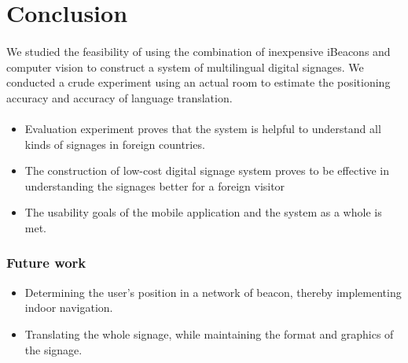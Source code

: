 \documentclass[12pt]{article}
\begin{document}
\section{Conclusion}
\label{sect-conclusion}
\paragraph{}We studied the feasibility of using the combination of inexpensive iBeacons and computer vision to construct a system of multilingual digital signages. We conducted a crude experiment using an actual room to estimate the positioning accuracy and accuracy of language translation. 

\paragraph{}

\begin{itemize}
	\item Evaluation experiment proves that the system is helpful to understand all kinds of signages in foreign countries. 
	\item The construction of low-cost digital signage system proves to be effective in understanding the signages better for a foreign visitor
	\item The usability goals of the mobile application and the system as a whole is met.
\end{itemize}

\subsubsection{Future work}

\begin{itemize}
	\item Determining the user's position in a network of beacon, thereby implementing indoor navigation.
	\item Translating the whole signage, while maintaining the format and graphics of the signage. 
\end{itemize}


\cleardoublepage
{}


\end{document}
